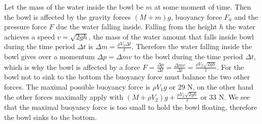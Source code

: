 {\ifEngSolution
Let the mass of the water inside the bowl be $m$ at some moment of time. Then the bowl is affected by the gravity forces $(M+m)g$, buoyancy force $F_{ü}$ and the pressure force $F$ due the water falling inside. Falling from the height $h$ the water achieves a speed $v=\sqrt{2gh}$, the mass of the water amount that falls inside bowl during the time period $\Delta t$ is $\Delta m = \frac{\rho V_2 \Delta t}{t}$. Therefore the water falling inside the bowl gives over a momentum $\Delta p =\Delta m v$ to the bowl during the time period $\Delta t$, which is why the bowl is affected by a force $F=\frac{\Delta p}{\Delta t}=\frac{\Delta m v}{\Delta t}=\frac{\rho V_2 \sqrt{2gh}}{t}$. For the bowl not to sink to the bottom the buoyancy force must balance the two other forces. The maximal possible buoyancy force is $\rho V_1 g$ or 29 N, on the other hand the other forces maximally apply with $(M+\rho V_2)g + \frac{\rho V_2 \sqrt{2gh}}{t}$ or 33 N. We see that the maximal buoyancy force is too small to hold the bowl floating, therefore the bowl sinks to the bottom.
\fi
}